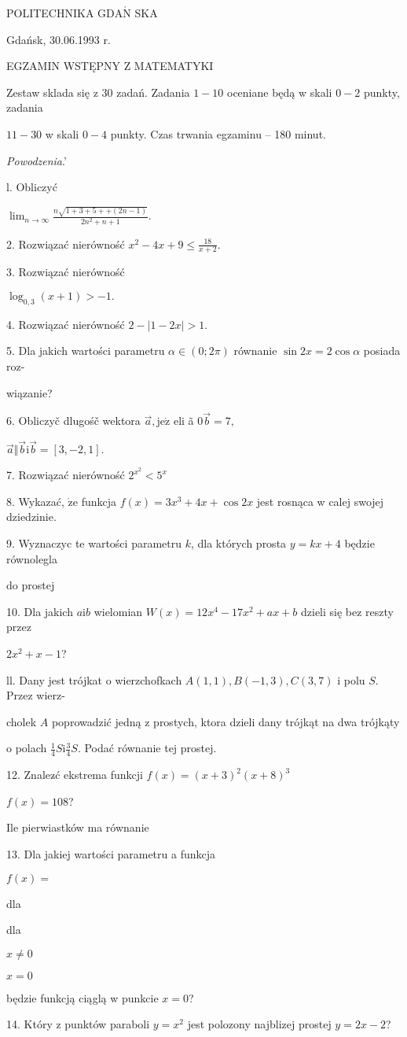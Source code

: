 \documentclass[a4paper,12pt]{article}
\begin{document}
POLITECHNIKA $\mathrm{G}\mathrm{D}\mathrm{A}\acute{\mathrm{N}}$ SKA

Gdańsk, 30.06.1993 r.

EGZAMIN WSTĘPNY Z MATEMATYKI

Zestaw sklada się z 30 zadań. Zadania $1-10$ oceniane będą w skali $0-2$ punkty, zadania

$11-30$ w skali $0-4$ punkty. Czas trwania egzaminu -- 180 minut.

{\it Powodzenia}.'

l. Obliczyć

$\displaystyle \lim_{n\rightarrow\infty}\frac{n\sqrt{1+3+5++(2n-1)}}{2n^{2}+n+1}.$

2. Rozwiązać nierówność $x^{2}-4x+9\displaystyle \leq\frac{18}{x+2}.$

3. Rozwiązać nierówność

$\log_{0,3}(x+1)>-1.$

4. Rozwiązać nierówność $2-|1-2x|>1.$

5. Dla jakich wartości parametru $\alpha \in (0;2\pi)$ równanie $\sin 2x=  2\cos\alpha$ posiada roz-

wiązanie?

6. Obliczyč dlugośč wektora $\vec{a}, \mathrm{j}\mathrm{e}\dot{\mathrm{z}}$ eli ã $0\vec{b}=7,$

$\vec{a}\Vert\vec{b} \mathrm{i} \vec{b}=[3,-2,1].$

7. Rozwiązać nierówność $2^{x^{2}}<5^{x}$

8. Wykazać, $\dot{\mathrm{z}}\mathrm{e}$ funkcja $f(x)=3x^{3}+4x+\cos 2x$ jest rosnąca w calej swojej dziedzinie.

9. Wyznaczyc te wartości parametru $k$, dla których prosta $y=kx+4$ będzie równolegla

do prostej 

10. Dla jakich $a\mathrm{i}b$ wielomian $W(x)=12x^{4}-17x^{2}+ax+b$ dzieli się bez reszty przez

$2x^{2}+x-1$?

ll. Dany jest trójkat o wierzchofkach $A(1,1), B(-1,3), C(3,7)$ i polu $S$. Przez wierz-

cholek $A$ poprowadzić jedną z prostych, ktora dzieli dany trójkąt na dwa trójkąty

o polach $\displaystyle \frac{1}{4}S\mathrm{i}\frac{3}{4}S$. Podać równanie tej prostej.

12. Znalez$\acute{}$ć ekstrema funkcji $f(x) = (x+3)^{2}(x+8)^{3}$

$f(x)=108$?

Ile pierwiastków ma równanie

13. Dla jakiej wartości parametru a funkcja

$f(x)=$

dla

dla

$x\neq 0$

$x=0$

będzie funkcją ciąglą w punkcie $x=0$?

14. Który z punktów paraboli $y=x^{2}$ jest polozony najblizej prostej $y=2x-2$?
\end{document}
